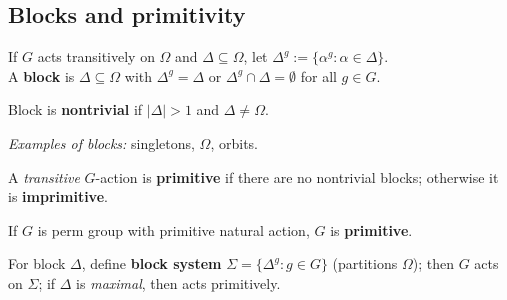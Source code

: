 \subsection{Blocks and primitivity}

\begin{slide}
    \begin{definition}[block]
        \vspace{0pt}
        If $G$ acts transitively on $\Omega$ and $\Delta \subseteq \Omega$, let $\Delta^g := \{\alpha^g : \alpha \in \Delta\}$. \\
        A \textbf{block} is $\Delta \subseteq \Omega$ with $\Delta^g = \Delta$ or $\Delta^g \cap \Delta = \emptyset$ for all $g \in G$. \pause

        Block is \textbf{nontrivial} if $|\Delta| > 1$ and $\Delta \neq \Omega$.
    \end{definition}

    \textit{Examples of blocks:} singletons, $\Omega$, orbits. \pause

    \begin{definition}[primitivity]
        \vspace{0pt}
        A \textit{transitive} $G$-action is \textbf{primitive} if there are no nontrivial blocks; otherwise it is \textbf{imprimitive}.

        If $G$ is perm group with primitive natural action, $G$ is \textbf{primitive}.
    \end{definition} \pause

    For block $\Delta$, define \textbf{block system} $\Sigma = \{\Delta^g : g \in G\}$ (partitions $\Omega$); then $G$ acts on $\Sigma$; if $\Delta$ is \textit{maximal}, then acts primitively.
\end{slide}

